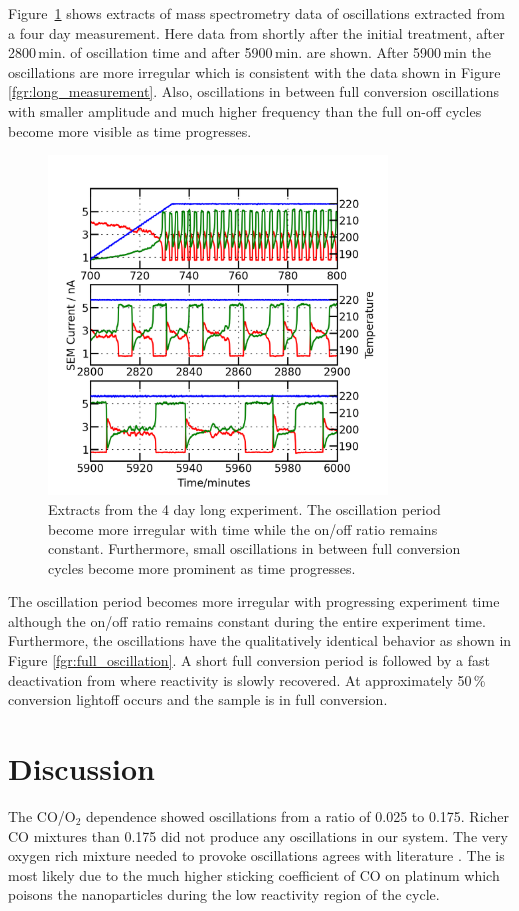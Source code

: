 \documentclass[8.5pt,twoside,twocolumn]{article}
\begin{document}
Figure~\ref{fgr:extracts} shows extracts of mass spectrometry data of oscillations extracted from a four day measurement. Here data from shortly after the initial treatment, after 2800\,min. of oscillation time and after 5900\,min. are shown. After 5900\,min the oscillations are more irregular which is consistent with the data shown in Figure \ref{fgr:long_measurement}. Also, oscillations in between full conversion oscillations with smaller amplitude and much higher frequency than the full on-off cycles become more visible as time progresses.
\begin{figure}[h]
  \centering
  \includegraphics[width=9cm]{extracts_from_very_long_oscillation.png}
  \caption{Extracts from the 4 day long experiment. The oscillation period become more irregular with time while the on/off ratio remains constant. Furthermore, small oscillations in between full conversion cycles become more prominent as time progresses.}
  \label{fgr:extracts}
\end{figure}

The oscillation period becomes more irregular with progressing experiment time although the on/off ratio remains constant during the entire experiment time. Furthermore, the oscillations have the qualitatively identical behavior as shown in Figure \ref{fgr:full_oscillation}. A short full conversion period is followed by a fast deactivation from where reactivity is slowly recovered. At approximately 50\,\% conversion lightoff occurs and the sample is in full conversion.

\section{Discussion}
The CO/O$_2$ dependence showed oscillations from a ratio of 0.025 to 0.175. Richer CO mixtures than 0.175 did not produce any oscillations in our system. The very oxygen rich mixture needed to provoke oscillations agrees with literature \cite{Singh2010,Hendriksen2005}. The is most likely due to the much higher sticking coefficient of CO on platinum which poisons the nanoparticles during the low reactivity region of the cycle.
\end{document}
